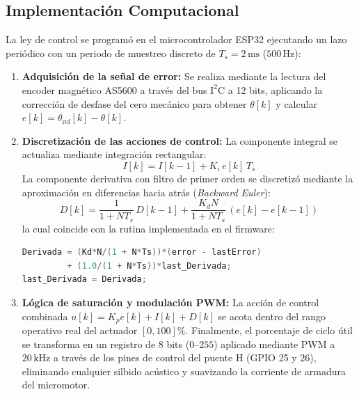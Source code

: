 \subsection{Implementación Computacional}
La ley de control se programó en el microcontrolador ESP32 ejecutando un lazo periódico con un periodo de muestreo discreto de $T_s = 2\,\mathrm{ms}$ ($500\,\mathrm{Hz}$):

\begin{enumerate}
  \item \textbf{Adquisición de la señal de error:} Se realiza mediante la lectura del encoder magnético AS5600 a través del bus $\mathrm{I^2C}$ a 12 bits, aplicando la corrección de desfase del cero mecánico para obtener $\theta[k]$ y calcular $e[k] = \theta_{\mathrm{ref}}[k] - \theta[k]$.

  \item \textbf{Discretización de las acciones de control:}
  La componente integral se actualiza mediante integración rectangular:
  \begin{equation}
    I[k] = I[k-1] + K_i\,e[k]\,T_s
  \end{equation}
  La componente derivativa con filtro de primer orden se discretizó mediante la aproximación en diferencias hacia atrás (\textit{Backward Euler}):
  \begin{equation}
    D[k] = \frac{1}{1 + N T_s}\,D[k-1] + \frac{K_d N}{1 + N T_s}\,(e[k] - e[k-1])
  \end{equation}
  la cual coincide con la rutina implementada en el firmware:
  \begin{lstlisting}[language=C++]
Derivada = (Kd*N/(1 + N*Ts))*(error - lastError) 
         + (1.0/(1 + N*Ts))*last_Derivada;
last_Derivada = Derivada;
  \end{lstlisting}

  \item \textbf{Lógica de saturación y modulación PWM:}
  La acción de control combinada $u[k] = K_p e[k] + I[k] + D[k]$ se acota dentro del rango operativo real del actuador $[0, 100]\%$. Finalmente, el porcentaje de ciclo útil se transforma en un registro de 8 bits ($0\text{--}255$) aplicado mediante PWM a $20\,\mathrm{kHz}$ a través de los pines de control del puente H (GPIO 25 y 26), eliminando cualquier silbido acústico y suavizando la corriente de armadura del micromotor.
\end{enumerate}
